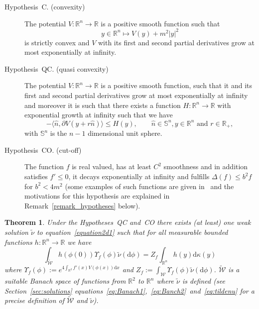 \documentclass[a4paper,10pt]{article}
\newcommand{\assign}{:=}
\newcommand{\mathd}{\mathrm{d}}
\newtheorem{theorem}{Theorem}
\newcommand{\descriptionparagraphs}[1]{\begin{description}#1\end{description}}
\begin{document}
{\descriptionparagraphs{\item[Hypothesis~C. (convexity)] The potential $V :
\mathbb{R}^n \rightarrow \mathbb{R}$ is a positive smooth function such that
\[ y \in \mathbb{R}^n \mapsto V (y) + m^2 | y |^2 \]
is strictly convex and $V$ with its first and second partial derivatives grow
at most exponentially at infinity.

\item[Hypothesis~QC. (quasi convexity)] The potential $V : \mathbb{R}^n
\rightarrow \mathbb{R}$ is a positive smooth function, such that it and its
first and second partial derivatives grow at most exponentially at infinity
and moreover it is such that there exists a function $H : \mathbb{R}^n
\rightarrow \mathbb{R}$ with exponential growth at infinity such that we have
\[ - \langle \hat{n}, \partial V (y + r \hat{n}) \rangle \leqslant H (y),
   \qquad \text{$\hat{n} \in \mathbb{S}^n, y \in \mathbb{R}^n$ and $r \in
   \mathbb{R}_+$}, \]
with $\mathbb{S}^n$ is the $n - 1$ dimensional unit sphere.

\item[Hypothesis~CO. (cut-off) ] The function $f$ is real valued, has at least
$C^2$ smoothness and in addition satisfies $f' \leqslant 0$, it decays
exponentially at infinity and fulfills $\Delta (f) \leqslant b^2 f$ for $b^2 <
4 m^2$ (some examples of such functions are given in~{\cite{Klein1984}} and
the motivations for this hypothesis are explained in
Remark~\ref{remark_hypotheses} below).}}

\begin{theorem}
  \label{th:dim-red-qc}Under the Hypotheses~QC and~CO there exists (at least)
  one weak solution $\tilde{\nu}$ to equation~{\eqref{equation2d1}} such that
  for all measurable bounded functions $h : \mathbb{R}^n \rightarrow
  \mathbb{R}$ we have
  \begin{equation}
    \int_{\widetilde{\mathcal{W}}} h (\phi (0)) \Upsilon_f (\phi)  \tilde{\nu}
    (\mathd \phi) = Z_f \int_{\mathbb{R}^n} h (y) \mathd \kappa (y)
    \label{eq:prec-dim-red}
  \end{equation}
  where $\Upsilon_f (\phi) \assign e^{4 \int_{\mathbb{R}^2} f' (x) V (\phi
  (x)) \mathd x}$ and $Z_f \assign \int_{\mathcal{W}} \Upsilon_f (\phi)
  \tilde{\nu} (\mathd \phi)$. $\widetilde{\mathcal{W}}$ is a suitable Banach
  space of functions from $\mathbb{R}^2$ to $\mathbb{R}^n$ where $\tilde{\nu}$
  is defined (see Section~\ref{sec:solutions}
  equations~{\eqref{eq:Banach1}},~{\eqref{eq:Banch2}}~and~{\eqref{eq:tildenu}}
  for a precise definition of $\widetilde{\mathcal{W}}$ and $\tilde{\nu}$).
\end{theorem}
\end{document}
